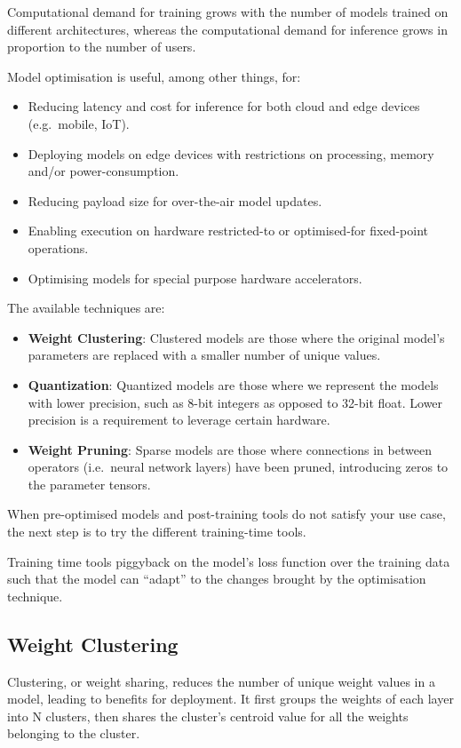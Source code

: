Computational demand for training grows with the number of models trained on
different architectures, whereas the computational demand for inference grows
in proportion to the number of users.

Model optimisation is useful, among other things, for:

\begin{itemize}
    \item Reducing latency and cost for inference for both cloud and edge
        devices (e.g.\ mobile, IoT).
    \item Deploying models on edge devices with restrictions on processing,
        memory and/or power-consumption.
    \item Reducing payload size for over-the-air model updates.
    \item Enabling execution on hardware restricted-to or optimised-for
        fixed-point operations.
    \item Optimising models for special purpose hardware accelerators.
\end{itemize}

The available techniques are:

\begin{itemize}
    \item \textbf{Weight Clustering}: Clustered models are those where the
        original model's parameters are replaced with a smaller number of
        unique values.
    \item \textbf{Quantization}: Quantized models are those where we represent
        the models with lower precision, such as 8-bit integers as opposed to
        32-bit float. Lower precision is a requirement to leverage certain
        hardware.
    \item \textbf{Weight Pruning}: Sparse models are those where connections in
        between operators (i.e.\ neural network layers) have been pruned,
        introducing zeros to the parameter tensors.
\end{itemize}

When pre-optimised models and post-training tools do not satisfy your use case,
the next step is to try the different training-time tools.

Training time tools piggyback on the model's loss function over the training
data such that the model can ``adapt'' to the changes brought by the
optimisation technique.~\cite{tfmot:intro}

\subsection{Weight Clustering}
Clustering, or weight sharing, reduces the number of unique weight values in a
model, leading to benefits for deployment. It first groups the weights of each
layer into N clusters, then shares the cluster's centroid value for all the
weights belonging to the cluster.

